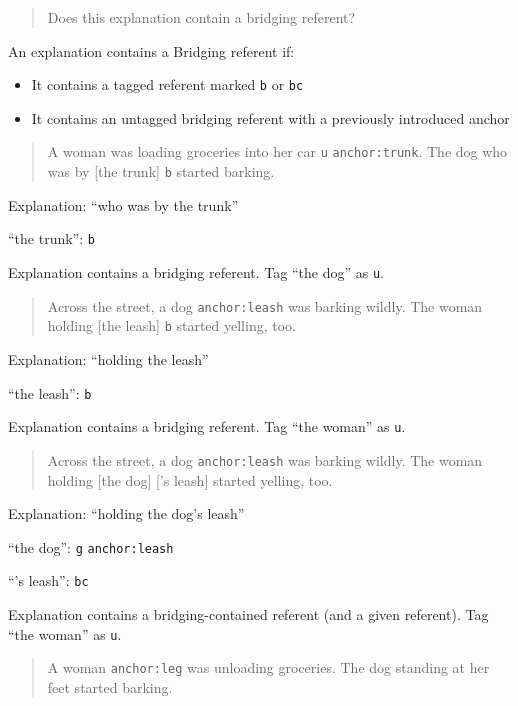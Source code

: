 \documentclass[
]{book}
\providecommand{\tightlist}{%
  \setlength{\itemsep}{0pt}\setlength{\parskip}{0pt}}
\begin{document}
\begin{quote}
Does this explanation contain a bridging referent?
\end{quote}

An explanation contains a Bridging referent if:

\begin{itemize}
\tightlist
\item
  It contains a tagged referent marked \texttt{b} or \texttt{bc}
\item
  It contains an untagged bridging referent with a previously introduced anchor
\end{itemize}

\begin{quote}
A woman was loading groceries into her car \texttt{u} \texttt{anchor:trunk}.
The dog who was by {[}the trunk{]} \texttt{b} started barking.
\end{quote}

Explanation: ``who was by the trunk''

``the trunk'': \texttt{b}

Explanation contains a bridging referent.
Tag ``the dog'' as \texttt{u}.

\begin{quote}
Across the street, a dog \texttt{anchor:leash} was barking wildly.
The woman holding {[}the leash{]} \texttt{b} started yelling, too.
\end{quote}

Explanation: ``holding the leash''

``the leash'': \texttt{b}

Explanation contains a bridging referent.
Tag ``the woman'' as \texttt{u}.

\begin{quote}
Across the street, a dog \texttt{anchor:leash} was barking wildly.
The woman holding {[}the dog{]} {[}'s leash{]} started yelling, too.
\end{quote}

Explanation: ``holding the dog's leash''

``the dog'': \texttt{g} \texttt{anchor:leash}

``'s leash'': \texttt{bc}

Explanation contains a bridging-contained referent (and a given referent).
Tag ``the woman'' as \texttt{u}.

\begin{quote}
A woman \texttt{anchor:leg} was unloading groceries.
The dog standing at her feet started barking.
\end{quote}
\end{document}
